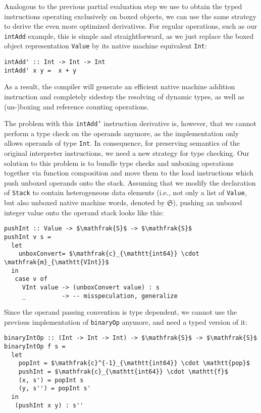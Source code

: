 \documentclass[preprint,10pt]{popl14conf}
\begin{document}
Analogous to the previous partial evaluation step we use to obtain the typed instructions
operating exclusively on boxed objects, we can use the same strategy to derive the even more
optimized derivatives.
For regular operations, such as our \texttt{intAdd} example, this is simple and straightforward, as
we just replace the boxed object representation \texttt{Value} by its native machine equivalent
\texttt{Int}:
\begin{lstlisting}[style=prettyhaskell]
intAdd' :: Int -> Int -> Int
intAdd' x y =  x + y
\end{lstlisting}
As a result, the compiler will generate an efficient native machine addition instruction and
completely sidestep the resolving of dynamic types, as well as (un-)boxing and reference counting
operations.


The problem with this \texttt{intAdd'} instruction derivative is, however, that we cannot perform a
type check on the operands anymore, as the implementation only allows operands of type
\texttt{Int}.
In consequence, for preserving semantics of the original interpreter instructions, we need a new
strategy for type checking.
Our solution to this problem is to bundle type checks and unboxing operations together via function
composition and move them to the load instructions which push unboxed operands onto the stack.
Assuming that we modify the declaration of \texttt{Stack} to contain heterogeneous data elements
(i.e., not only a list of \texttt{Value}, but also unboxed native machine words, denoted by
$\mathfrak{S}$), pushing an unboxed integer value onto the operand stack looks like this:
\begin{lstlisting}[style=prettyhaskell]
pushInt :: Value -> $\mathfrak{S}$ -> $\mathfrak{S}$
pushInt v s =
  let
    unboxConvert= $\mathfrak{c}_{\mathtt{int64}} \cdot \mathfrak{m}_{\mathtt{VInt}}$
  in
   case v of
     VInt value -> (unboxConvert value) : s
     _          -> -- misspeculation, generalize
\end{lstlisting}

Since the operand passing convention is type dependent, we cannot use the previous implementation of
\texttt{binaryOp} anymore, and need a typed version of it:
\begin{lstlisting}[style=prettyhaskell]
binaryIntOp :: (Int -> Int -> Int) -> $\mathfrak{S}$ -> $\mathfrak{S}$
binaryIntOp f s =
  let
    popInt = $\mathfrak{c}^{-1}_{\mathtt{int64}} \cdot \mathtt{pop}$
    pushInt = $\mathfrak{c}_{\mathtt{int64}} \cdot \mathtt{f}$
    (x, s') = popInt s
    (y, s'') = popInt s'
  in
   (pushInt x y) : s''
\end{lstlisting}
\end{document}
